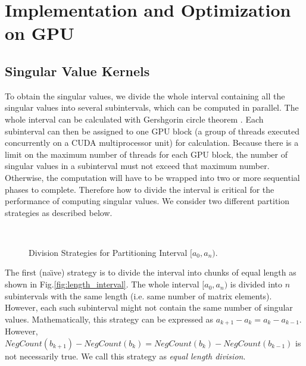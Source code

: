 \section{Implementation and Optimization on GPU} \label{sec:implementation}
\subsection{Singular Value Kernels} \label{sec_svalue}
To obtain the singular values, we divide the whole interval containing all the singular values into several subintervals, which can be computed in parallel. 
The whole interval can be calculated with Gershgorin circle theorem \cite{gershgorin}.
Each subinterval can then be assigned to one GPU block (a group of threads executed concurrently on a CUDA multiprocessor unit) for calculation.
Because there is a limit on the maximum number of threads for each GPU block,
the number of singular values in a subinterval must not exceed that maximum number. Otherwise, the computation will have to be wrapped into two or more sequential phases to complete.
Therefore how to divide the interval is critical for the performance of
computing singular values. We consider two different partition
strategies as described below. 
\begin{figure}[hbpt]
\vspace{-0.15in}
\centering
  \\
  \vspace{-0.15in}
\vspace{-0.1in}
\caption{Division Strategies for Partitioning Interval  $[a_0, a_n)$.} 
\vspace{-0.1in}
\end{figure}

The first (na\"{\i}ve) strategy is to divide the interval into chunks of equal length as shown in Fig.\ref{fig:length_interval}.
The whole interval $[a_0, a_n)$ is divided into $n$ subintervals with
the same length (i.e. same number of matrix elements). However, each
such subinterval might not contain the same number of singular values.
Mathematically, this strategy can be expressed as
$a_{k+1}-a_k = a_{k}-a_{k-1}$. However, $NegCount(b_{k+1})-NegCount(b_{k}) = NegCount(b_{k})-NegCount(b_{k-1})$ is not necessarily true. We call this strategy as {\it equal length division}.

